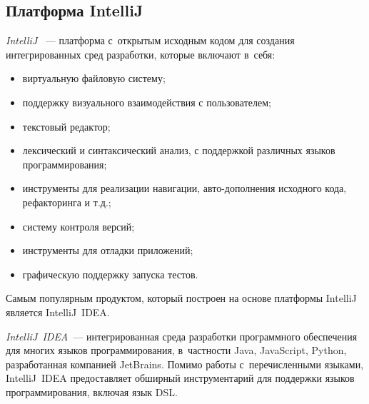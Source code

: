 \subsection{Платформа IntelliJ} \label{sub131}

\textit{IntelliJ} ~--- платформа с~открытым исходным кодом для создания интегрированных сред разработки, которые включают в~себя:

\begin{itemize}
\item{виртуальную файловую систему;}
\item{поддержку визуального взаимодействия с пользователем;}	
\item{текстовый редактор;}	
\item{лексический и синтаксический анализ, с поддержкой различных языков программирования;}
\item{инструменты для реализации навигации, авто-дополнения исходного кода, рефакторинга и т.д.;}
\item{систему контроля версий;}
\item{инструменты для отладки приложений;}
\item{графическую поддержку запуска тестов.}
\end{itemize}

Самым популярным продуктом, который построен на основе платформы IntelliJ является IntelliJ~IDEA.

\textit{IntelliJ~IDEA}~--- интегрированная среда разработки программного обеспечения для многих языков программирования, в~частности Java, JavaScript, Python, разработанная компанией JetBrains. Помимо работы с~перечисленными языками, IntelliJ~IDEA предоставляет обширный инструментарий для поддержки языков программирования, включая язык DSL. 